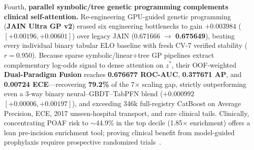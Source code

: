 Fourth, \textbf{parallel symbolic/tree genetic programming complements clinical self-attention.} Re-engineering GPU-guided genetic programming (\textbf{JAIN Ultra GP v2}) erased six engineering bottlenecks to gain $+0.003984$ ($[+0.00196, +0.00601]$) over legacy JAIN (0.671666 $\to$ \textbf{0.675649}), beating every individual binary tabular ELO baseline with fresh CV-7 verified stability ($r=0.950$). Because sparse symbolic/linear$+$tree GP pipelines extract complementary log-odds signal to dense attention on $z^*$, their OOF-weighted \textbf{Dual-Paradigm Fusion} reaches \textbf{0.676677 ROC-AUC}, \textbf{0.377671 AP}, and \textbf{0.00724 ECE}---recovering \textbf{79.2\%} of the 7$\times$ scaling gap, strictly outperforming even a 3-way binary neural--GBDT--TabPFN blend ($+0.000992$ $[+0.00006, +0.00197]$), and exceeding 346k full-registry CatBoost on Average Precision, ECE, 2017 unseen-hospital transport, and rare clinical tails. Clinically, concentrating POAF risk to $\sim$44.9\% in the top decile (1.85$\times$ enrichment) offers a lean pre-incision enrichment tool; proving clinical benefit from model-guided prophylaxis requires prospective randomized trials~\cite{gaudino2021palacs,chatterjee2026sts}.

